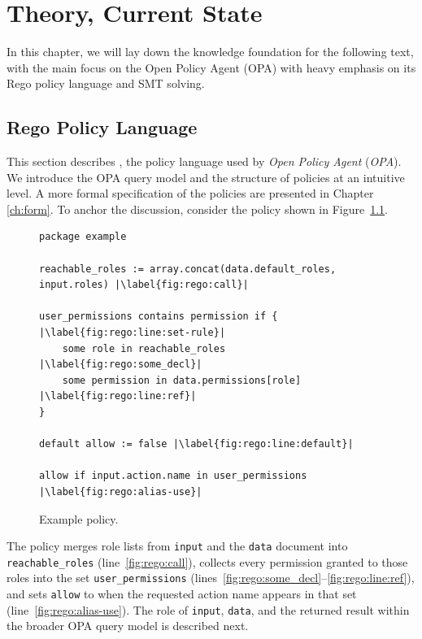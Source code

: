 \chapter{Theory, Current State}
\label{ch:theory}

In this chapter, we will lay down the knowledge foundation for the following text, with the main focus on the Open Policy Agent (OPA) with heavy emphasis on its Rego policy language and SMT solving.

\section{Rego Policy Language}
\label{sec:rego}

This section describes \rego, the policy language used by \emph{Open Policy Agent} (\emph{OPA}).
We introduce the OPA query model and the structure of \rego policies at an intuitive level.
A more formal specification of the policies are presented in Chapter \ref{ch:form}.
To anchor the discussion, consider the policy shown in Figure~\ref{fig:rego}.

\begin{figure}
  \label{fig:rego}
  \begin{lstlisting}[language=Rego,escapechar=|]
package example

reachable_roles := array.concat(data.default_roles, input.roles) |\label{fig:rego:call}|

user_permissions contains permission if { |\label{fig:rego:line:set-rule}|
    some role in reachable_roles |\label{fig:rego:some_decl}|
    some permission in data.permissions[role] |\label{fig:rego:line:ref}|
}

default allow := false |\label{fig:rego:line:default}|

allow if input.action.name in user_permissions |\label{fig:rego:alias-use}|
\end{lstlisting}
  \caption{Example \rego policy.}
\end{figure}

The policy merges role lists from \texttt{input} and the \texttt{data} document into \texttt{reachable\_roles} (line~\ref{fig:rego:call}), collects every permission granted to those roles into the set \texttt{user\_permissions} (lines~\ref{fig:rego:some_decl}--\ref{fig:rego:line:ref}), and sets \texttt{allow} to \true when the requested action name appears in that set (line~\ref{fig:rego:alias-use}).
The role of \texttt{input}, \texttt{data}, and the returned result within the broader OPA query model is described next.

